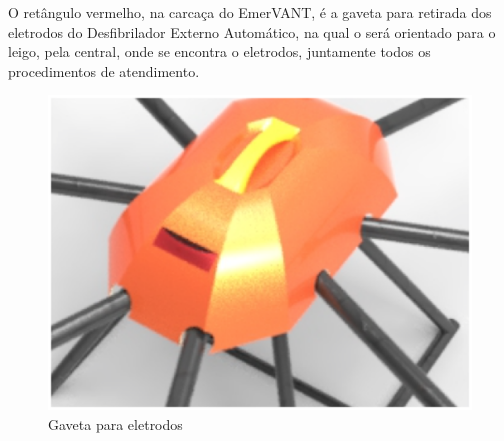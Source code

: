O retângulo vermelho, na carcaça do EmerVANT, é a gaveta para retirada dos eletrodos do Desfibrilador Externo Automático, na qual o será orientado para o leigo, pela central, onde se encontra o eletrodos, juntamente todos os procedimentos de atendimento.

\begin{figure}[h!]
    \centering
      \includegraphics[keepaspectratio=true,scale=0.5]{figuras/keyshot2.eps}
    \caption{ Gaveta para eletrodos}
    \label{fig:keyshot2}
\end{figure}





















